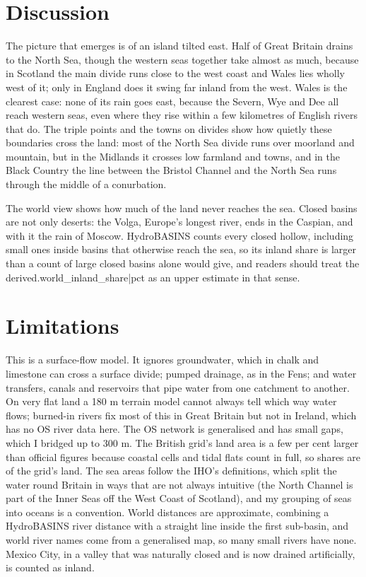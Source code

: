 \documentclass[11pt,a4paper]{article}
\begin{document}
\section{Discussion}

The picture that emerges is of an island tilted east. Half of Great Britain drains to the North Sea, though the western seas together take almost as much, because in Scotland the main divide runs close to the west coast and Wales lies wholly west of it; only in England does it swing far inland from the west. Wales is the clearest case: none of its rain goes east, because the Severn, Wye and Dee all reach western seas, even where they rise within a few kilometres of English rivers that do. The triple points and the towns on divides show how quietly these boundaries cross the land: most of the North Sea divide runs over moorland and mountain, but in the Midlands it crosses low farmland and towns, and in the Black Country the line between the Bristol Channel and the North Sea runs through the middle of a conurbation.

The world view shows how much of the land never reaches the sea. Closed basins are not only deserts: the Volga, Europe's longest river, ends in the Caspian, and with it the rain of Moscow. HydroBASINS counts every closed hollow, including small ones inside basins that otherwise reach the sea, so its inland share is larger than a count of large closed basins alone would give, and readers should treat the {{derived.world_inland_share|pct}} as an upper estimate in that sense.

\section{Limitations}

This is a surface-flow model. It ignores groundwater, which in chalk and limestone can cross a surface divide; pumped drainage, as in the Fens; and water transfers, canals and reservoirs that pipe water from one catchment to another. On very flat land a 180 m terrain model cannot always tell which way water flows; burned-in rivers fix most of this in Great Britain but not in Ireland, which has no OS river data here. The OS network is generalised and has small gaps, which I bridged up to 300 m. The British grid's land area is a few per cent larger than official figures because coastal cells and tidal flats count in full, so shares are of the grid's land. The sea areas follow the IHO's definitions, which split the water round Britain in ways that are not always intuitive (the North Channel is part of the Inner Seas off the West Coast of Scotland), and my grouping of seas into oceans is a convention. World distances are approximate, combining a HydroBASINS river distance with a straight line inside the first sub-basin, and world river names come from a generalised map, so many small rivers have none. Mexico City, in a valley that was naturally closed and is now drained artificially, is counted as inland.
\end{document}
